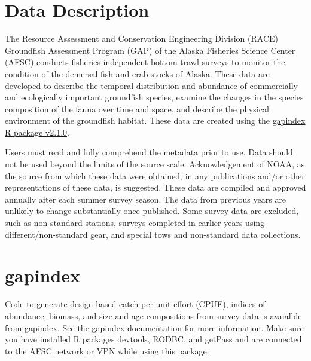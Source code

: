 \documentclass[
  letterpaper,
  oneside,
  open=any]{scrbook}
\begin{document}
\section*{Data Description}\label{data-description}


The Resource Assessment and Conservation Engineering Division (RACE)
Groundfish Assessment Program (GAP) of the Alaska Fisheries Science
Center (AFSC) conducts fisheries-independent bottom trawl surveys to
monitor the condition of the demersal fish and crab stocks of Alaska.
These data are developed to describe the temporal distribution and
abundance of commercially and ecologically important groundfish species,
examine the changes in the species composition of the fauna over time
and space, and describe the physical environment of the groundfish
habitat. These data are created using the
\href{https://afsc-gap-products.github.io/gapindex/index.html}{gapindex
R package v2.1.0}.

Users must read and fully comprehend the metadata prior to use. Data
should not be used beyond the limits of the source scale.
Acknowledgement of NOAA, as the source from which these data were
obtained, in any publications and/or other representations of these
data, is suggested. These data are compiled and approved annually after
each summer survey season. The data from previous years are unlikely to
change substantially once published. Some survey data are excluded, such
as non-standard stations, surveys completed in earlier years using
different/non-standard gear, and special tows and non-standard data
collections.

\section*{gapindex}\label{gapindex}


Code to generate design-based catch-per-unit-effort (CPUE), indices of
abundance, biomass, and size and age compositions from survey data is
avaialble from
\href{https://github.com/afsc-gap-products/gapindex}{gapindex}. See the
\href{https://afsc-gap-products.github.io/gapindex/}{gapindex
documentation} for more information. Make sure you have installed R
packages devtools, RODBC, and getPass and are connected to the AFSC
network or VPN while using this package.
\end{document}
